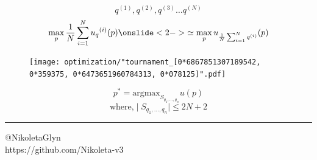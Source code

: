\documentclass{beamer}
\begin{document}
\begin{frame}
\begin{block}
\huge
\[ q^{(1)}, q^{(2)}, q^{(3)} \dots q^{(N)} \]
\vfill
\large
\begin{equation*}
  \max_p \frac{1}{N} \sum_{i=1} ^ {N} {u_q}^{(i)} (p) \onslide<2->{\simeq \max_p  
  u_{\frac {1}{N} \sum_{i=1} ^ N q^{(i)}}(p)} 
\end{equation*}
\end{block}
\end{frame}

\begin{frame}
\begin{figure}[H]
  \texttt{[image: optimization/"tournament\_[0*6867851307189542, 0*359375, 0*6473651960784313, 0*078125]".pdf]}    
\end{figure}
\end{frame}

\begin{frame}
\begin{block}
\huge
\[  p^* = \text{argmax}_{S_{q_1, \dots, q_n}} u (p)  \]
\vfill
\[ \text{where,} \mid S_{q_1, \dots, q_n} \mid  \leq 2N + 2  \]
\end{block}
\pause

\vspace{0.5cm}
\rule{\textwidth}{1pt}
\centering

    \small{@NikoletaGlyn}\\
    \small{https://github.com/Nikoleta-v3}\\
\end{frame}
\end{document}
